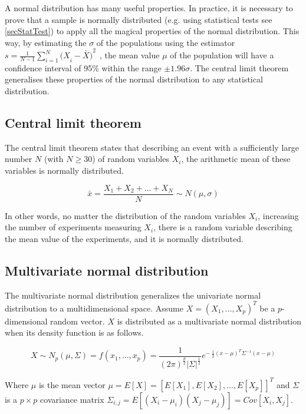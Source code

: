 A normal distribution has many useful properties. In practice, it is necessary to prove that a sample is normally distributed (e.g. using statistical tests see \ref{secStatTest}) to apply all the magical properties of the normal distribution. This way, by estimating the $\sigma$ of the populations using the estimator $s=\frac{1}{N-1}\sum_{i=1}^{N}{{{(X}_i-\bar{X})}^2\ \ }$, the mean value $\mu$ of the population will have a confidence interval of 95\% within the range $\pm1.96\sigma$. The central limit theorem generalises these properties of the normal distribution to any statistical distribution.

\subsection{Central limit theorem}
The central limit theorem states that describing an event with a sufficiently large number $N$ (with $N\geq30$) of random variables $X_i$, the arithmetic mean of these variables is normally distributed.

\begin{equation}
\bar{x}=\frac{X_1+X_2+\ldots+X_N}{N} \sim N(\mu,\sigma)
\label{eq_centralLimitTheorem}
\end{equation}



In other words, no matter the distribution of the random variables $X_i$, increasing the number of experiments measuring $X_i$, there is a random variable describing the mean value of the experiments, and it is normally distributed.

\subsection{Multivariate normal distribution}
The multivariate normal distribution generalizes the univariate normal distribution to a multidimensional space. Assume $X=\left(X_1,\ldots,X_p\right)^T$ be a $p$-dimensional random vector. $X$ is distributed as a multivariate normal distribution when its density function is as follows.

\begin{equation}
X\sim N_p\left(\mu,\Sigma\right)= f\left(x_1,\ldots,x_p\right)=\frac{1}{\left(2\pi\right)^\frac{p}{2}\left|\Sigma\right|^\frac{1}{2}}e^{-\ \frac{1}{2}\left(x-\mu\right)^T\Sigma^{-1}(x-\mu)}
\label{eq_multivariateNormal}
\end{equation}

Where $\mu$ is the mean vector $\mu=E\left[X\right]=\left[E\left[X_1\right],E\left[X_2\right],\ldots,E\left[X_p\right]\right]^T$ and $\Sigma$ is a $p\times p$ covariance matrix $\Sigma_{i,j}=E\left[\left(X_i-\mu_i\right)\left(X_j-\mu_j\right)\right]=Cov[X_i,X_j]$.

